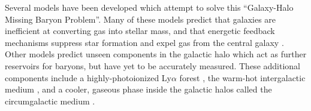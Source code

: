 Several models have been developed which attempt to solve this
``Galaxy-Halo Missing Baryon Problem''. Many of these models predict
that galaxies are inefficient at converting gas into stellar mass, and
that energetic feedback mechanisms suppress star formation and expel
gas from the central galaxy \citep{Somerville1999,
  Oppenheimer2010}. Other models predict unseen components in the
galactic halo which act as further reservoirs for baryons, but have
yet to be accurately measured.  These additional components include a
highly-photoionized Ly$\alpha$ forest \citep{Sargent1980, Cen1994},
the warm-hot intergalactic medium \citep[WHIM][]{Cen1999, Dave1999},
and a cooler, gaseous phase inside the galactic halos called the
circumgalactic medium \citep[CGM][]{Bahcall1969, Bergeron1985,
  Lanzetta1995, Prochaska2011, Tumlinson2011, Werk2013,
  Werk2014}. 
